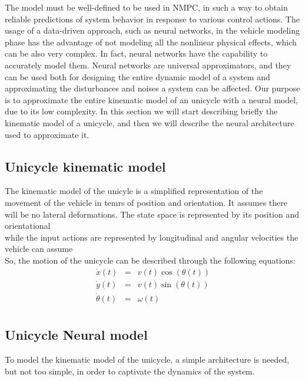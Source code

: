 The model must be well-defined to be used in NMPC, in such a way 
to obtain reliable predictions of system behavior in response to various control actions.
The usage of a data-driven approach, such as neural networks, in the vehicle modeling phase has the
advantage of not modeling all the nonlinear physical effects, which can be also very complex.
In fact, neural networks have the capability to accurately model them. 
Neural networks are universal approximators, and they can be used both for designing 
the entire dynamic model of a system and approximating the disturbances and noises 
a system can be affected.
Our purpose is to approximate the entire kinematic model of an unicycle with a neural model,
due to its low complexity. 
In this section we will start describing briefly the kinematic model of a unicycle, and then 
we will describe the neural architecture used to approximate it.

\subsection{Unicycle kinematic model}
The kinematic model of the unicyle is a simplified representation of the movement of the vehicle
in temrs of position and orientation. It assumes there will be no lateral deformations. 
The state space is represented by its position and orientational
\begin{equation}
    [x, y, \theta]
\end{equation} 
while the input actions are represented by longitudinal and angular velocities the vehicle can 
assume
\begin{equation}
    [v, \omega]
\end{equation}
So, the motion of the unicycle can be described through the following equations:
\begin{eqnarray}
    \dot{x}(t) &=& v(t) \cos(\theta(t)) \\
    \dot{y}(t) &=& v(t) \sin(\theta(t)) \\
    \dot{\theta}(t) &=& \omega(t) \\
\end{eqnarray}

\subsection{Unicycle Neural model}

To model the kinematic model of the unicycle, a simple architecture is
needed, but not too simple, in order to captivate the dynamics of the
system.

